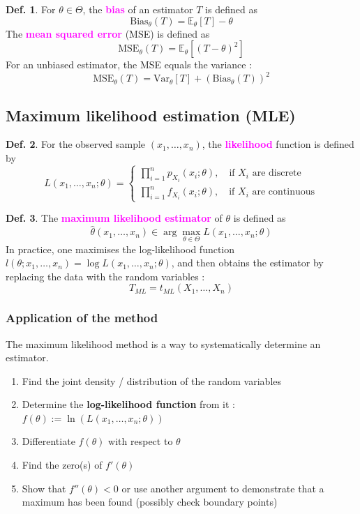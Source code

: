 \documentclass[8pt,a4paper,landscape]{article}
\theoremstyle{definition}
\newtheorem{definition}{Def.}[section]
\theoremstyle{example}
\theoremstyle{intuition}
\theoremstyle{definition}
\newcommand{\mydef}[1]{\textcolor{magenta}{\textbf{#1}}}
\newcommand{\expect}[1]{\mathbb{E}_{\theta}\left[ #1 \right]}
\newcommand{\biast}[1]{\text{Bias}_{\theta}\left( #1 \right)}
\newcommand{\mset}[1]{\text{MSE}_{\theta}\left( #1 \right)}
\newcommand{\vart}[1]{\text{Var}_{\theta}\left[ #1 \right]}
\begin{document}
\begin{multicols}{3}
			\begin{definition}
				For $\theta \in \Theta$, the \mydef{bias} of an estimator $T$ is defined as 
				$$
					\biast{T} = \expect{T} - \theta
				$$
				The \mydef{mean squared error} (MSE) is defined as 
				$$
					\mset{T} = \expect{(T - \theta)^2}
				$$
				For an unbiased estimator, the MSE equals the variance :
				$$
					\mset{T} = \vart{T} + (\biast{T})^2
				$$
			\end{definition}


			\subsection{Maximum likelihood estimation (MLE)}
				\begin{definition}
					For the observed sample $(x_1, \ldots, x_n)$, the \mydef{likelihood} function is defined by
					$$
						L(x_1, \ldots, x_n ; \theta) = 
							\begin{cases}
								\prod^{n}_{i = 1} p_{X_i}(x_i ; \theta), \quad \text{if } X_i \text{ are discrete}\\
								\prod^{n}_{i = 1} f_{X_i}(x_i ; \theta), \quad \text{if } X_i \text{ are continuous}
							\end{cases}
					$$
				\end{definition}

				\begin{definition}
					The \mydef{maximum likelihood estimator} of $\theta$ is defined as 
					$$
						\hat{\theta}(x_1, \ldots, x_n) \in \arg\max_{\theta \in \Theta} L(x_1, \ldots, x_n ; \theta)
					$$
					In practice, one maximises the log-likelihood function $l(\theta ; x_1, \ldots, x_n) = \log L(x_1, \ldots, x_n ; \theta)$, and then obtains the estimator by replacing the data with the random variables : 
					$$
						T_{ML} = t_{ML}(X_1, \ldots, X_n)
					$$
				\end{definition}


				\subsubsection{Application of the method}
					The maximum likelihood method is a way to systematically determine an estimator.
					\begin{enumerate}
						\item Find the joint density / distribution of the random variables
						\item Determine the \textbf{log-likelihood function} from it : $f(\theta) := \ln (L(x_1, \ldots, x_n ; \theta))$
						\item Differentiate $f(\theta)$ with respect to $\theta$
						\item Find the zero(s) of $f'(\theta)$
						\item Show that $f''(\theta) < 0$ or use another argument to demonstrate that a maximum has been found (possibly check boundary points)
					\end{enumerate}



\end{multicols}
\end{document}
